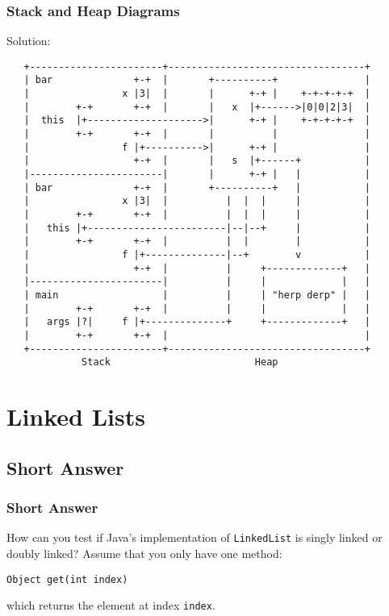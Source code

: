 \documentclass[9pt]{beamer}
\begin{document}
\begin{frame}[fragile]
  \frametitle{Stack and Heap Diagrams}
  Solution:

  {\footnotesize
  \begin{verbatim}
   +-----------------------+----------------------------------+
   | bar              +-+  |       +----------+               |
   |                x |3|  |       |      +-+ |    +-+-+-+-+  |
   |        +-+       +-+  |       |   x  |+------>|0|0|2|3|  |
   |  this  |+-------------------->|      +-+ |    +-+-+-+-+  |
   |        +-+       +-+  |       |          |               |
   |                f |+---------->|      +-+ |               |
   |                  +-+  |       |   s  |+------+           |
   |-----------------------|       |      +-+ |   |           |
   | bar              +-+  |       +----------+   |           |
   |                x |3|  |          |  |  |     |           |
   |        +-+       +-+  |          |  |  |     |           |
   |   this |+------------------------|--|--+     |           |
   |        +-+       +-+  |          |  |        |           |
   |                f |+--------------|--+        v           |
   |                  +-+  |          |     +-------------+   |
   |-----------------------|          |     |             |   |
   | main                  |          |     | "herp derp" |   |
   |        +-+       +-+  |          |     |             |   |
   |   args |?|     f |+--------------+     +-------------+   |
   |        +-+       +-+  |                                  |
   +-----------------------+----------------------------------+
             Stack                         Heap
  \end{verbatim}
  }
\end{frame}

\section{Linked Lists}
\subsection{Short Answer}
\begin{frame}[fragile]
  \frametitle{Short Answer}
  How can you test if Java's implementation of {\tt LinkedList} is singly
  linked or doubly linked? Assume that you only have one method:

  \vspace{1cm}
  {\tt Object get(int index)}
  \vspace{1cm}

  which returns the element at index {\tt index}.
\end{frame}
\end{document}
